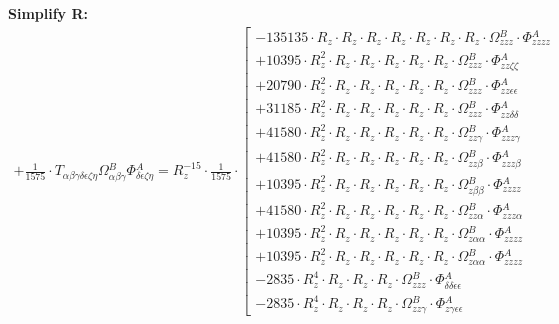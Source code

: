 \documentclass{article}
\begin{document}
\textbf{Simplify R:}
\begin{subequations}\begin{gather}
+ \frac{1}{1575} \cdot T_{\alpha{}\beta{}\gamma{}\delta{}\epsilon{}\zeta{}\eta{}} \Omega{}^{B}_{\alpha{}\beta{}\gamma{}} \Phi{}^{A}_{\delta{}\epsilon{}\zeta{}\eta{}} = R_{z}^{-15} \cdot \frac{1}{1575} \cdot  \left[ \begin{array}{c} 
 		- 135135 \cdot R_{z} \cdot R_{z} \cdot R_{z} \cdot R_{z} \cdot R_{z} \cdot R_{z} \cdot R_{z} \cdot \Omega{}^{B}_{zzz} \cdot \Phi{}^{A}_{zzzz} 
 \\[0.2em] 		 + 10395 \cdot R_{z}^{2} \cdot R_{z} \cdot R_{z} \cdot R_{z} \cdot R_{z} \cdot R_{z} \cdot \Omega{}^{B}_{zzz} \cdot \Phi{}^{A}_{zz\zeta{}\zeta{}} 
 \\[0.2em] 		 + 20790 \cdot R_{z}^{2} \cdot R_{z} \cdot R_{z} \cdot R_{z} \cdot R_{z} \cdot R_{z} \cdot \Omega{}^{B}_{zzz} \cdot \Phi{}^{A}_{zz\epsilon{}\epsilon{}} 
 \\[0.2em] 		 + 31185 \cdot R_{z}^{2} \cdot R_{z} \cdot R_{z} \cdot R_{z} \cdot R_{z} \cdot R_{z} \cdot \Omega{}^{B}_{zzz} \cdot \Phi{}^{A}_{zz\delta{}\delta{}} 
 \\[0.2em] 		 + 41580 \cdot R_{z}^{2} \cdot R_{z} \cdot R_{z} \cdot R_{z} \cdot R_{z} \cdot R_{z} \cdot \Omega{}^{B}_{zz\gamma{}} \cdot \Phi{}^{A}_{zzz\gamma{}} 
 \\[0.2em] 		 + 41580 \cdot R_{z}^{2} \cdot R_{z} \cdot R_{z} \cdot R_{z} \cdot R_{z} \cdot R_{z} \cdot \Omega{}^{B}_{zz\beta{}} \cdot \Phi{}^{A}_{zzz\beta{}} 
 \\[0.2em] 		 + 10395 \cdot R_{z}^{2} \cdot R_{z} \cdot R_{z} \cdot R_{z} \cdot R_{z} \cdot R_{z} \cdot \Omega{}^{B}_{z\beta{}\beta{}} \cdot \Phi{}^{A}_{zzzz} 
 \\[0.2em] 		 + 41580 \cdot R_{z}^{2} \cdot R_{z} \cdot R_{z} \cdot R_{z} \cdot R_{z} \cdot R_{z} \cdot \Omega{}^{B}_{zz\alpha{}} \cdot \Phi{}^{A}_{zzz\alpha{}} 
 \\[0.2em] 		 + 10395 \cdot R_{z}^{2} \cdot R_{z} \cdot R_{z} \cdot R_{z} \cdot R_{z} \cdot R_{z} \cdot \Omega{}^{B}_{z\alpha{}\alpha{}} \cdot \Phi{}^{A}_{zzzz} 
 \\[0.2em] 		 + 10395 \cdot R_{z}^{2} \cdot R_{z} \cdot R_{z} \cdot R_{z} \cdot R_{z} \cdot R_{z} \cdot \Omega{}^{B}_{z\alpha{}\alpha{}} \cdot \Phi{}^{A}_{zzzz} 
 \\[0.2em] 		 - 2835 \cdot R_{z}^{4} \cdot R_{z} \cdot R_{z} \cdot R_{z} \cdot \Omega{}^{B}_{zzz} \cdot \Phi{}^{A}_{\delta{}\delta{}\epsilon{}\epsilon{}} 
 \\[0.2em] 		 - 2835 \cdot R_{z}^{4} \cdot R_{z} \cdot R_{z} \cdot R_{z} \cdot \Omega{}^{B}_{zz\gamma{}} \cdot \Phi{}^{A}_{z\gamma{}\epsilon{}\epsilon{}} 

\end{array}
\end{gather}
\end{subequations}
\end{document}
